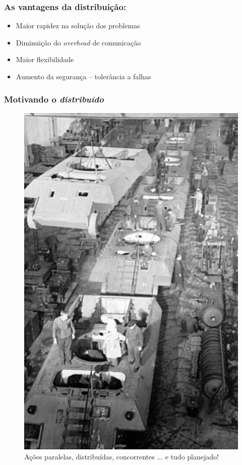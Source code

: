 

\begin{frame} %

\frametitle{As vantagens da distribuição:}

\begin{itemize}
  \item Maior rapidez na solução dos problemas
  \item Diminuição do \textit{overhead} de comunicação
  \item Maior flexibilidade
  \item Aumento da segurança -- tolerância a falhas
\end{itemize}

\end{frame}





\begin{frame}

  \frametitle{Motivando o  \textit{distribuído}}
        
\begin{figure}[!ht]
\centering
\includegraphics[height =.6\textheight,width=.4\textwidth]{figuras/fabrica_tanques.jpg}
\caption{Ações paralelas, distribuídas, concorrentes ... e tudo planejado!}
\end{figure}
    
   
\end{frame}







